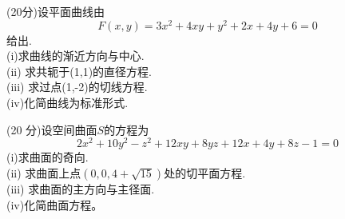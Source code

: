 \begin{solution}
    
\end{solution}

\begin{problem}
    (20分)设平面曲线由
$$F(x,y)=3x^2+4xy+y^2+2x+4y+6=0$$
给出.\\
(i)求曲线的渐近方向与中心.\\
(ii) 求共轭于(1,1)的直径方程.\\
(iii) 求过点(1,-2)的切线方程.\\
(iv)化简曲线为标准形式.
\end{problem}

\begin{solution}
    
\end{solution}

\begin{problem}
    (20 分)设空间曲面$S$的方程为
$$2x^{2}+10y^{2}-z^{2}+12xy+8yz+12x+4y+8z-1=0$$
(i)求曲面的奇向.\\
(ii) 求曲面上点$(0,0,4+\sqrt{15})$处的切平面方程.\\
(iii) 求曲面的主方向与主径面.\\
(iv)化简曲面方程。
\end{problem}

\begin{solution}
    
\end{solution}